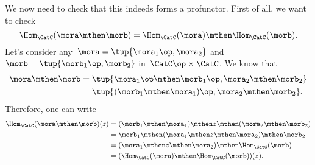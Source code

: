 We now need to check that this indeeds forms a profunctor. First of all, we want to check
\begin{equation}
    \label{eq:hom5}
    \Hom_\CatC(\mora \mthen \morb)=\Hom_\CatC(\mora)\mthen \Hom_\CatC(\morb).
\end{equation}
Let's consider any~$\mora=\tup{\mora_1\op, \mora_2}$ and~$\morb=\tup{\morb_1\op,\morb_2}$ in~$\CatC\op \times \CatC$.
We know that
\begin{equation}
    \label{eq:hom6}
    \begin{aligned}
        \mora\mthen \morb&=\tup{\mora_1\op \mthen \morb_1\op, \mora_2\mthen \morb_2}\\
        &=\tup{(\morb_1\mthen \mora_1)\op, \mora_2\mthen \morb_2}.
    \end{aligned}
\end{equation}
Therefore, one can write
\begin{equation}
    \label{eq:hom7}
    \begin{aligned}
        \Hom_\CatC(\mora \mthen \morb)(z)&=(\morb_1\mthen \mora_1)\mthen z \mthen (\mora_2\mthen \morb_2)\\
        &=\morb_1\mthen (\mora_1\mthen z \mthen \mora_2) \mthen \morb_2\\
        &=(\mora_1\mthen z \mthen \mora_2)\mthen \Hom_\CatC(\morb)\\
        &=(\Hom_\CatC(\mora)\mthen \Hom_\CatC(\morb))(z).
    \end{aligned}
\end{equation}
\devel{}

